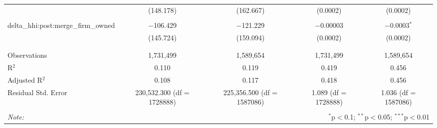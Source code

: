 \begin{table}[H]
{\begin{tabular}{@{\extracolsep{5pt}}lcccc}
   & (148.178) & (162.667) & (0.0002) & (0.0002) \\  

   & & & & \\  

  delta\_hhi:post:merge\_firm\_owned & $-$106.429 & $-$121.229 & $-$0.00003 & $-$0.0003$^{*}$ \\  

   & (145.724) & (159.094) & (0.0002) & (0.0002) \\  

   & & & & \\  

 \hline \\[-1.8ex]  

 Observations & 1,731,499 & 1,589,654 & 1,731,499 & 1,589,654 \\  

 R$^{2}$ & 0.110 & 0.119 & 0.419 & 0.456 \\  

 Adjusted R$^{2}$ & 0.108 & 0.117 & 0.418 & 0.456 \\  

 Residual Std. Error & 230,532.300 (df = 1728888) & 225,356.500 (df = 1587086) & 1.089 (df = 1728888) & 1.036 (df = 1587086) \\  

 \hline  

 \hline \\[-1.8ex]  

 \textit{Note:}  & \multicolumn{4}{r}{$^{*}$p$<$0.1; $^{**}$p$<$0.05; $^{***}$p$<$0.01} \\  

 \end{tabular}}  

 \end{table}  

 



